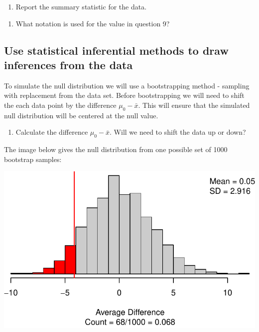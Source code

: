 \documentclass[
]{report}
\providecommand{\tightlist}{%
  \setlength{\itemsep}{0pt}\setlength{\parskip}{0pt}}
\begin{document}
\begin{enumerate}
\def\labelenumi{\arabic{enumi}.}
\setcounter{enumi}{8}
\tightlist
\item
  Report the summary statistic for the data.
\end{enumerate}

\vspace{0.5in}

\begin{enumerate}
\def\labelenumi{\arabic{enumi}.}
\setcounter{enumi}{9}
\tightlist
\item
  What notation is used for the value in question 9?
\end{enumerate}

\vspace{0.5in}

\hypertarget{use-statistical-inferential-methods-to-draw-inferences-from-the-data}{%
\subsection{Use statistical inferential methods to draw inferences from the data}\label{use-statistical-inferential-methods-to-draw-inferences-from-the-data}}

To simulate the null distribution we will use a bootstrapping method - sampling with replacement from the data set. Before bootstrapping we will need to shift the each data point by the difference \(\mu_0 - \bar{x}\). This will ensure that the simulated null distribution will be centered at the null value.

\begin{enumerate}
\def\labelenumi{\arabic{enumi}.}
\setcounter{enumi}{10}
\tightlist
\item
  Calculate the difference \(\mu_0 - \bar{x}\). Will we need to shift the data up or down?
\end{enumerate}

\vspace{1in}

The image below gives the null distribution from one possible set of 1000 bootstrap samples:

\begin{center}\includegraphics[width=0.7\linewidth]{08-paired_files/figure-latex/unnamed-chunk-4-1} \end{center}
\end{document}
